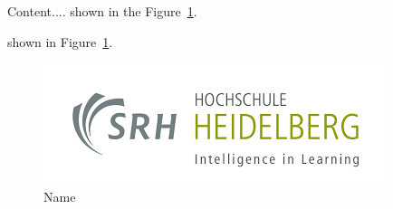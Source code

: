 Content....
shown in the Figure~\ref{fig:test_bib_1}.

shown in Figure~\ref{fig:test_bib_1}.
\begin{figure}[h]
\centering
\includegraphics[width=0.8\columnwidth]{images/university.png}
\caption{Name~\cite{test_bib}}
\label{fig:test_bib_1}
\end{figure}